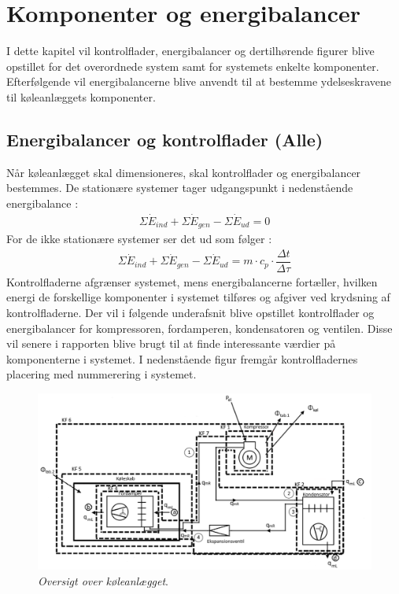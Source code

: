 \documentclass[../Hovedrapport.tex]{subfiles}
\begin{document}
\chapter{Komponenter og energibalancer}
    \label{chap:dimensionering}
    \vspace{-30pt}
I dette kapitel vil kontrolflader, energibalancer og dertilhørende figurer blive opstillet for det overordnede system samt for systemets enkelte komponenter. Efterfølgende vil energibalancerne blive anvendt til at bestemme ydelseskravene til køleanlæggets komponenter. 
\section{Energibalancer og kontrolflader (Alle)}
Når køleanlægget skal dimensioneres, skal kontrolflader og energibalancer bestemmes.
De stationære systemer tager udgangspunkt i nedenstående energibalance \citep{termo}:
\begin{align}
    \Sigma \dot{E}_{ind} + \Sigma \dot{E}_{gen} - \Sigma \dot{E}_{ud} = 0
\end{align}
For de ikke stationære systemer ser det ud som følger \citep{termo}:
\begin{align}
    \Sigma \dot{E}_{ind} + \Sigma \dot{E}_{gen} - \Sigma \dot{E}_{ud} = m \cdot c_p \cdot \dfrac{\Delta t}{\Delta \tau}
\end{align}
Kontrolfladerne afgrænser systemet, mens energibalancerne fortæller, hvilken energi de forskellige komponenter i systemet tilføres og afgiver ved krydsning af kontrolfladerne. Der vil i følgende underafsnit blive opstillet kontrolflader og energibalancer for kompressoren, fordamperen, kondensatoren og ventilen. Disse vil senere i rapporten blive brugt til at finde interessante værdier på komponenterne i systemet. I nedenstående figur fremgår kontrolfladernes placering med nummerering i systemet.

\begin{figure}[H] %
	\centering
	\includegraphics[width=1\textwidth]{Billeder/tingudennavn.png}
	\caption{\textit{Oversigt over køleanlægget}.}
	\label{fig:Anlægsoversigt}
\end{figure}
\end{document}
